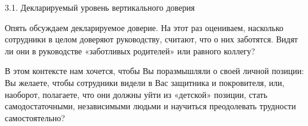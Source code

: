 \begin{frame}{3.1. Декларируемый уровень вертикального доверия  }

\tiny

Опять обсуждаем декларируемое доверие. На этот раз оцениваем, насколько сотрудники в целом доверяют руководству, считают, что о них заботятся. Видят ли они в руководстве «заботливых родителей» или равного коллегу? 
\smallskip

В этом контексте нам хочется, чтобы Вы поразмышляли о своей личной позиции: Вы желаете, чтобы сотрудники видели в Вас защитника и покровителя, или, наоборот, полагаете, что они должны уйти из «детской» позиции, стать самодостаточными, независимыми людьми и научиться преодолевать трудности самостоятельно? 

\end{frame}


